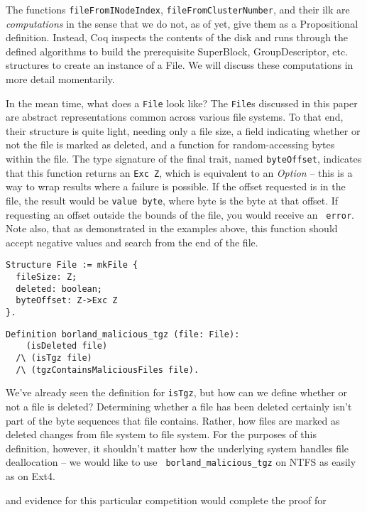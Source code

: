 \documentclass[nocopyrightspace]{sigplanconf}
\begin{document}
The functions {\tt fileFromINodeIndex}, {\tt fileFromClusterNumber}, and their
ilk are {\it computations} in the sense that we do not, as of yet, give them
as a Propositional definition. Instead, Coq inspects the contents of the disk
and runs through the defined algorithms to build the prerequisite SuperBlock,
GroupDescriptor, etc. structures to create an instance of a File. We will
discuss these computations in more detail momentarily.

In the mean time, what does a {\tt File} look like? The {\tt File}s discussed
in this paper are abstract representations common across various file systems.
To that end, their structure is quite light, needing only a file size, a field
indicating whether or not the file is marked as deleted, and a function for
random-accessing bytes within the file. The type signature of the final trait,
named {\tt byteOffset}, indicates that this function returns an {\tt Exc Z},
which is equivalent to an {\it Option} -- this is a way to wrap results where
a failure is possible. If the offset requested is in the file, the result
would be {\tt value byte}, where byte is the byte at that offset. If
requesting an offset outside the bounds of the file, you would receive an {\tt
error}. Note also, that as demonstrated in the examples above, this function
should accept negative values and search from the end of the file.

\begin{lstlisting}
Structure File := mkFile {
  fileSize: Z;
  deleted: boolean;
  byteOffset: Z->Exc Z
}.
\end{lstlisting}

\begin{lstlisting}
Definition borland_malicious_tgz (file: File):
    (isDeleted file)
  /\ (isTgz file)
  /\ (tgzContainsMaliciousFiles file).
\end{lstlisting}

We've already seen the definition for {\tt isTgz}, but how can we define
whether or not a file is deleted? Determining whether a file has been deleted
certainly isn't part of the byte sequences that file contains. Rather, how
files are marked as deleted changes from file system to file system. For the
purposes of this definition, however, it shouldn't matter how the underlying
system handles file deallocation -- we would like to use {\tt
borland\_malicious\_tgz} on NTFS as easily as on Ext4.


and evidence for this particular competition would complete the proof for
\end{document}
